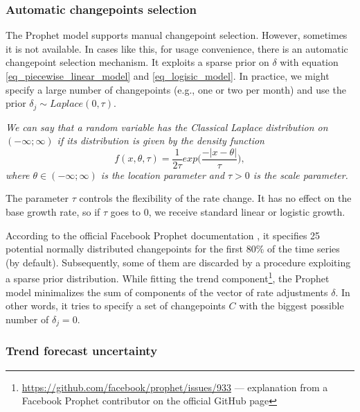 \subsubsection{Automatic changepoints selection}
\label{sec:automatic_cp_detection}
The Prophet model supports manual changepoint selection. However, sometimes it is not available. In cases like this, for usage convenience, there is an automatic changepoint selection mechanism. It exploits a sparse prior on $\delta$ with equation \ref{eq_piecewise_linear_model} and \ref{eq_logisic_model}. In practice, we might specify a large number of changepoints (e.g., one or two per month) and use the prior $\delta_j \sim Laplace(0, \tau)$. 
\begin{definition}
\textit{We can say that a random variable has the Classical Laplace distribution on $(-\infty ; \infty)$ if its distribution is given by the density function 
\begin{equation}
    f(x, \theta, \tau) = \frac{1}{2\tau}exp\bigg(\frac{-|x - \theta|}{\tau}\bigg),
\end{equation} 
where $\theta \in (-\infty ; \infty)$ is the location parameter and $\tau > 0$ is the scale parameter.} 
\end{definition}
The parameter $\tau$ controls the flexibility of the rate change. It has no effect on the base growth rate, so if $\tau$ goes to 0, we receive standard linear or logistic growth.

According to the official Facebook Prophet documentation \cite{ProphetDoc}, it specifies 25 potential normally distributed changepoints for the first 80\% of the time series (by default). Subsequently, some of them are discarded by a procedure exploiting a sparse prior distribution. While fitting the trend component\footnote{\url{https://github.com/facebook/prophet/issues/933} --- explanation from a Facebook Prophet contributor on the official GitHub page}, the Prophet model minimalizes the sum of components of the vector of rate adjustments $\delta$. In other words, it tries to specify a set of changepoints $C$ with the biggest possible number of $\delta_j = 0$.

\subsubsection{Trend forecast uncertainty}

